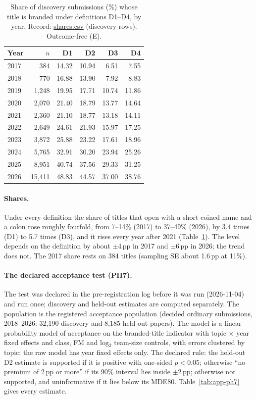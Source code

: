\begin{table}[t]
\centering\footnotesize
\setlength{\tabcolsep}{3.5pt}
\begin{tabular}{@{}lrrrrr@{}}
\toprule
Year & $n$ & D1 & D2 & D3 & D4 \\
\midrule
2017 & 384 & 14.32 & 10.94 & 6.51 & 7.55 \\
2018 & 770 & 16.88 & 13.90 & 7.92 & 8.83 \\
2019 & 1,248 & 19.95 & 17.71 & 10.74 & 11.86 \\
2020 & 2,070 & 21.40 & 18.79 & 13.77 & 14.64 \\
2021 & 2,360 & 21.10 & 18.77 & 13.18 & 14.11 \\
2022 & 2,649 & 24.61 & 21.93 & 15.97 & 17.25 \\
2023 & 3,872 & 25.88 & 23.22 & 17.61 & 18.96 \\
2024 & 5,765 & 32.91 & 30.20 & 23.94 & 25.26 \\
2025 & 8,951 & 40.74 & 37.56 & 29.33 & 31.25 \\
2026 & 15,411 & 48.83 & 44.57 & 37.00 & 38.76 \\
\bottomrule
\end{tabular}
\caption{Share of discovery submissions (\%) whose title is branded under definitions D1--D4, by year. Record:
\url{shares.csv} (discovery rows). Outcome-free (E).}
\label{tab:app-titles}
\end{table}

\paragraph{Shares.} Under every definition the share of titles that open with a short coined name and a colon rose
roughly fourfold, from 7--14\% (2017) to 37--49\% (2026), by 3.4 times (D1) to 5.7 times (D3), and it rises every year
after 2021 (Table~\ref{tab:app-titles}). The level depends on the definition by about $\pm$4\,pp in 2017 and $\pm$6\,pp
in 2026; the trend does not. The 2017 share rests on 384 titles (sampling SE about 1.6\,pp at 11\%).

\paragraph{The declared acceptance test (PH7).} The test was declared in the pre-registration log before it was run
(2026-11-04) and run once; discovery and held-out estimates are computed separately. The population is the registered
acceptance population (decided ordinary submissions, 2018--2026: 32,190 discovery and 8,185 held-out papers). The
model is a linear probability model of acceptance on the branded-title indicator with topic $\times$ year fixed effects
and class, FM and log$_2$ team-size controls, with errors clustered by topic; the raw model has year fixed effects
only. The declared rule: the held-out D2 estimate is supported if it is positive with one-sided $p<0.05$; otherwise
``no premium of 2\,pp or more'' if its 90\% interval lies inside $\pm$2\,pp; otherwise not supported, and uninformative
if it lies below its MDE80. Table~\ref{tab:app-ph7} gives every estimate.

